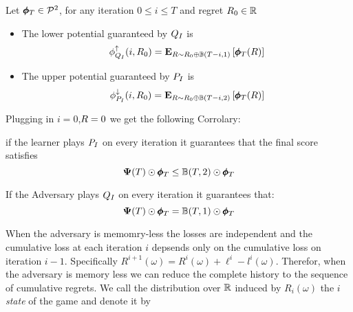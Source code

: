 \documentclass{article}[12pt]
\begin{document}
\begin{theorem} \label{thm:IntegerGameBounds}
  Let $\pmb{\phi}_{T} \in {\cal P}^{2}$, for any iteration $0 \leq i \leq T$ and
  regret $R_0 \in \mathbb{R}$ 
  \begin{itemize}
  \item
    The lower potential guaranteed by $Q_I$ is
     $$\phi_{Q_I}^{\uparrow}(i,R_0) = {\bf E}_{R \sim R_0 \oplus \mathbb{B}(T-i,1)}\left[ \pmb{\phi}_{T}(R) \right] $$
  \item
    The upper potential guaranteed by $P_I$ is
    $$\phi_{P_I}^{\downarrow}(i,R_0) = {\bf E}_{R \sim R_0 \oplus \mathbb{B}(T-i,2)}\left[ \pmb{\phi}_{T}(R) \right]$$
  \end{itemize}
\end{theorem}

Plugging in $i=0$,$R=0$ we get the following Corrolary:
\begin{corollary}
  if the learner plays $P_I$ on every iteration
  it guarantees that the final score satisfies
  $${\bf \Psi}(T) \odot \pmb{\phi}_{T} \leq \mathbb{B}(T,2) \odot \pmb{\phi}_{T} $$

  If the Adversary plays $Q_I$ on every iteration it guarantees
  that:
  $${\bf \Psi}(T) \odot \pmb{\phi}_{T} = \mathbb{B}(T,1) \odot \pmb{\phi}_{T} $$
\end{corollary}


When the adversary is memomry-less the losses are independent and the cumulative loss at each iteration $i$ depsends only on the cumulative loss on iteration $i-1$. Specifically
$ R^{i+1}(\omega) = R^{i}(\omega) + \ell^i - l^i(\omega)$. Therefor, when the adversary is memory less we can reduce the complete history to the sequence of cumulative regrets. We call the distribution over $\mathbb{R}$
induced by $R_i(\omega)$ the $i$ {\em state} of the game and denote it by
\begin{equation}
\end{equation}
\end{document}
